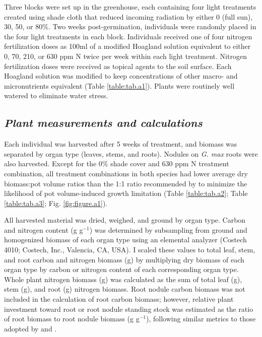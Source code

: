 Three blocks were set up in the greenhouse, each containing four light treatments created using shade cloth that reduced incoming radiation by either 0 (full sun), 30, 50, or 80\%. Two weeks post-germination, individuals were randomly placed in the four light treatments in each block. Individuals received one of four nitrogen fertilization doses as 100ml of a modified Hoagland solution  equivalent to either 0, 70, 210, or 630 ppm N twice per week within each light treatment. Nitrogen fertilization doses were received as topical agents to the soil surface. Each Hoagland solution was modified to keep concentrations of other macro- and micronutrients equivalent (Table \ref{table:tab.a1}). Plants were routinely well watered to eliminate water stress.

\subsection{\textit{Plant measurements and calculations}}
\noindent Each individual was harvested after 5 weeks of treatment, and biomass was separated by organ type (leaves, stems, and roots). Nodules on \textit{G. max} roots were also harvested. Except for the 0\% shade cover and 630 ppm N treatment combination, all treatment combinations in both species had lower average dry biomass:pot volume ratios than the 1:1 ratio recommended by  to minimize the likelihood of pot volume-induced growth limitation (Table \ref{table:tab.a2}; Table \ref{table:tab.a3}; Fig. \ref{fig:figure.a1}). 

All harvested material was dried, weighed, and ground by organ type. Carbon and nitrogen content (g g$^{-1}$) was determined by subsampling from ground and homogenized biomass of each organ type using an elemental analyzer (Costech 4010; Costech, Inc., Valencia, CA, USA). I scaled these values to total leaf, stem, and root carbon and nitrogen biomass (g) by multiplying dry biomass of each organ type by carbon or nitrogen content of each corresponding organ type. Whole plant nitrogen biomass (g) was calculated as the sum of total leaf (g), stem (g), and root (g) nitrogen biomass. Root nodule carbon biomass was not included in the calculation of root carbon biomass; however, relative plant investment toward root or root nodule standing stock was estimated as the ratio of root biomass to root nodule biomass (g g$^{-1}$), following similar metrics to those adopted by  and .

